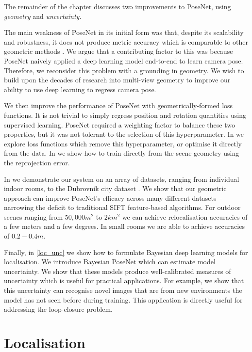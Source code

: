 The remainder of the chapter discusses two improvements to PoseNet, using \textit{geometry} and \textit{uncertainty}.

The main weakness of PoseNet in its initial form was that, despite its scalability and robustness, it does not produce metric accuracy which is comparable to other geometric methods \citep{Sattler14ECCV,svarm2014accurate}. We argue that a contributing factor to this was because PoseNet naively applied a deep learning model end-to-end to learn camera pose. Therefore, we reconsider this problem with a grounding in geometry. We wish to build upon the decades of research into multi-view geometry \citep{hartley2000} to improve our ability to use deep learning to regress camera pose.

We then improve the performance of PoseNet with geometrically-formed loss functions. It is not trivial to simply regress position and rotation quantities using supervised learning. PoseNet required a weighting factor to balance these two properties, but it was not tolerant to the selection of this hyperparameter. In  we explore loss functions which remove this hyperparameter, or optimise it directly from the data. In  we show how to train directly from the scene geometry using the reprojection error.

In  we demonstrate our system on an array of datasets, ranging from individual indoor rooms, to the Dubrovnik city dataset \citep{li2012worldwide}. We show that our geometric approach can improve PoseNet's efficacy across many different datasets -- narrowing the deficit to traditional SIFT feature-based algorithms. For outdoor scenes ranging from $50,000m^2$ to $2km^2$ we can achieve relocalisation accuracies of a few meters and a few degrees. In small rooms we are able to achieve accuracies of $0.2-0.4m$.

Finally, in \cref{loc_unc} we show how to formulate Bayesian deep learning models for localisation. We introduce Bayesian PoseNet which can estimate model uncertainty. We show that these models produce well-calibrated measures of uncertainty which is useful for practical applications. For example, we show that this uncertainty can recognise novel images that are from new environments the model has not seen before during training. This application is directly useful for addressing the loop-closure problem.






\section{Localisation}


